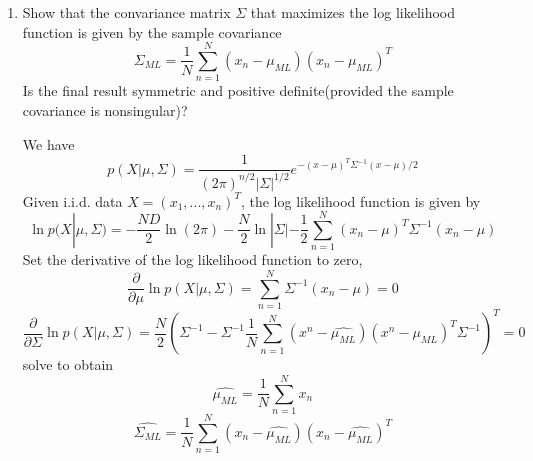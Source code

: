 \documentclass[a4paper]{article}
\begin{document}
\begin{enumerate}
		\item
		Show that the convariance matrix $\Sigma$ that maximizes the log likelihood function is given by the sample covariance
		$$
		\Sigma_{ML}=\frac{1}{N}\sum_{n=1}^{N}(x_n - \mu_{ML})(x_n - \mu_{ML})^{T}
		$$
		Is the final result symmetric and positive definite(provided the sample covariance is nonsingular)?
		\begin{solution}
			We have
			\begin{equation*}
				p(X|\mu,\Sigma)=\frac{1}{(2\pi)^{n/2}|\Sigma|^{1/2}}e^{-(x-\mu)^{T}\Sigma^{-1}(x-\mu)/2}
			\end{equation*}
			Given i.i.d. data $X=(x_1,...,x_n)^{T}$, the log likelihood function is given by
			\begin{equation*}
				\ln p(X|\mu,\Sigma) = -\frac{ND}{2}\ln(2\pi)-\frac{N}{2}\ln|\Sigma|-\frac{1}{2}\sum_{n=1}^{N}(x_n-\mu)^{T}\Sigma^{-1}(x_n-\mu)
			\end{equation*}
			Set the derivative of the log likelihood
			function to zero,
			\begin{equation*}
				\frac{\partial}{\partial\mu}\ln p(X|\mu,\Sigma)=\sum_{n=1}^{N}\Sigma^{-1}(x_n - \mu)=0
			\end{equation*}
			\begin{equation*}
				\frac{\partial}{\partial\Sigma}\ln p(X|\mu,\Sigma)=\frac{N}{2}(\Sigma^{-1}-\Sigma^{-1}\frac{1}{N}\sum_{n=1}^{N}(x^{n}-\hat{\mu_{ML}})(x^{n}-\mu_{ML})^{T}\Sigma^{-1})^{T}=0
			\end{equation*}
			solve to obtain
			\begin{equation*}
				\hat{\mu_{ML}}=\frac{1}{N}\sum_{n=1}^{N}x_n
			\end{equation*}
			\begin{equation*}
				\hat{\Sigma_{ML}}=\frac{1}{N}\sum_{n=1}^{N}(x_n-\hat{\mu_{ML}})(x_n - \hat{\mu_{ML}})^{T}
			\end{equation*}
		\end{solution}
		

\end{enumerate}
\end{document}
